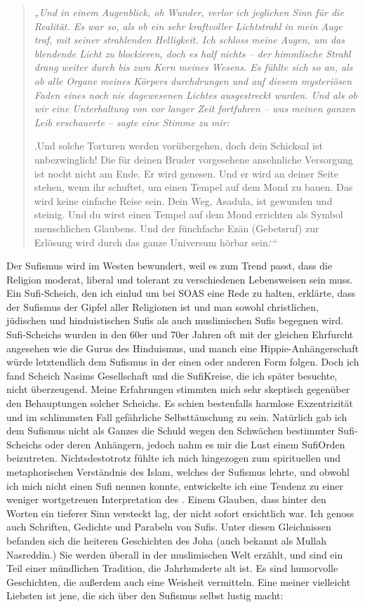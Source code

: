 \documentclass[12pt]{memoir}
\begin{document}
\begin{quote}
\itshape
„Und in einem Augenblick, oh Wunder,
verlor ich jeglichen Sinn für die Realität.
Es war so, als ob ein sehr kraftvoller Lichtstrahl in mein Auge traf,
mit seiner strahlenden Helligkeit.
Ich schloss meine Augen, um das blendende Licht zu blockieren,
doch es half nichts –
der himmlische Strahl drang weiter durch bis zum Kern meines Wesens.
Es fühlte sich so an, als ob alle Organe meines Körpers durchdrungen
und auf diesem mysteriösen Faden eines noch nie dagewesenen Lichtes
ausgestreckt wurden.
Und als ob wir eine Unterhaltung von vor langer Zeit fortfuhren –
was meinen ganzen Leib erschauerte –
sagte eine Stimme zu mir:

‚Und solche Torturen werden vorübergehen,
doch dein Schicksal ist unbezwinglich!
Die für deinen Bruder vorgesehene ansehnliche Versorgung
ist nocht nicht am Ende.
Er wird genesen.
Und er wird an deiner Seite stehen, wenn ihr schuftet,
um einen Tempel auf dem Mond zu bauen.
Das wird keine einfache Reise sein.
Dein Weg, Asadula, ist gewunden und steinig.
Und du wirst einen Tempel auf dem Mond errichten
als Symbol menschlichen Glaubens.
Und der fünchfache Ezān (Gebetsruf) zur Erlösung
wird durch das ganze Universum hörbar sein.‘“
\end{quote}

Der Sufismus wird im Westen bewundert, weil es zum Trend passt,
dass die Religion moderat, liberal
und tolerant zu verschiedenen Lebensweisen sein muss.
Ein Sufi-Scheich, den ich einlud um bei SOAS eine Rede zu halten,
erklärte, dass der Sufismus der Gipfel aller Religionen ist
und man sowohl christlichen, jüdischen und hinduistischen Sufis
als auch muslimischen Sufis begegnen wird.
Sufi-Scheichs wurden in den 60er und 70er Jahren
oft mit der gleichen Ehrfurcht angesehen wie die Gurus des Hinduismus,
und manch eine Hippie-Anhängerschaft würde letztendlich dem Sufismus
in der einen oder anderen Form folgen.
Doch ich fand Scheich Nasims Gesellschaft
und die Sufi\–Kreise, die ich später besuchte, nicht überzeugend.
Meine Erfahrungen stimmten mich sehr skeptisch
gegenüber den Behauptungen solcher Scheichs.
Es schien bestenfalls harmlose Exzentrizität
und im schlimmsten Fall gefährliche Selbsttäuschung zu sein.
Natürlich gab ich dem Sufismus nicht als Ganzes die Schuld
wegen den Schwächen bestimmter Sufi-Scheichs oder deren Anhängern,
jedoch nahm es mir die Lust einem Sufi\–Orden beizutreten.
Nichtsdestotrotz fühlte ich mich hingezogen
zum spirituellen und metaphorischen Verständnis des Islam,
welches der Sufismus lehrte,
und obwohl ich mich nicht einen Sufi nennen konnte,
entwickelte ich eine Tendenz
zu einer weniger wortgetreuen Interpretation des \Quran.
Einem Glauben, dass hinter den Worten ein tieferer Sinn versteckt lag,
der nicht sofort ersichtlich war.
Ich genoss auch Schriften, Gedichte und Parabeln von Sufis.
Unter diesen Gleichnissen befanden sich die heiteren Geschichten des Joha
(auch bekannt als Mullah Nasreddin.)
Sie werden überall in der muslimischen Welt erzählt,
und sind ein Teil einer mündlichen Tradition, die Jahrhunderte alt ist.
Es sind humorvolle Geschichten, die außerdem auch eine Weisheit vermitteln.
Eine meiner vielleicht Liebsten ist jene,
die sich über den Sufismus selbst lustig macht:
\end{document}
